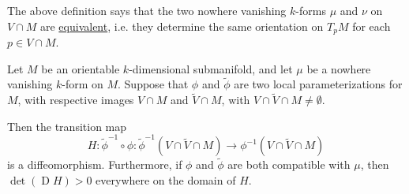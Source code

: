 \documentclass[notoc,notitlepage]{tufte-book}
\DeclareMathOperator{\D}{D}
\begin{document}
\begin{note}
  The above definition says that the two nowhere vanishing $k$-forms $\mu$ and
  $\nu$ on $V \cap M$ are
  \hyperref[defn:same_and_opposite_orientations]{equivalent}, i.e. they
  determine the same orientation on $T_p M$ for each $p \in V \cap M$.
\end{note}

\begin{propo}\label{propo:compatibility_of_parameterizations_with_the_orientation}
  Let $M$ be an orientable $k$-dimensional submanifold, and let $\mu$ be a
  nowhere vanishing $k$-form on $M$. Suppose that $\phi$ and $\tilde{\phi}$ are
  two local parameterizations for $M$, with respective images $V \cap M$ and
  $\tilde{V} \cap M$, with $V \cap \tilde{V} \cap M \neq \emptyset$.

  Then the transition map
  \begin{equation*}
    H : \tilde{\phi}^{-1} \circ \phi : \tilde{\phi}^{-1} (V \cap \tilde{V} \cap
    M) \to \phi^{-1}(V \cap \tilde{V} \cap M)
  \end{equation*}
  is a diffeomorphism. Furthermore, if $\phi$ and $\tilde{\phi}$ are both
  compatible with $\mu$, then $\det (\D H) > 0$ everywhere on the domain of $H$.
\end{propo}
\end{document}

